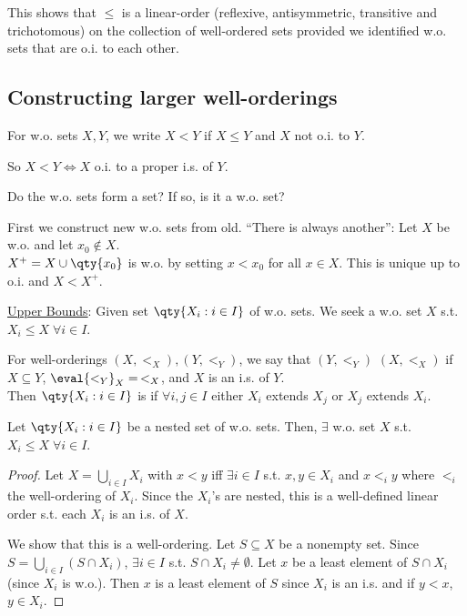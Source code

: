 \begin{remark}
    This shows that $\leq$ is a linear-order (reflexive, antisymmetric, transitive and trichotomous) on the collection of well-ordered sets provided we identified w.o. sets that are o.i. to each other.
\end{remark}

\subsection{Constructing larger well-orderings}

\begin{definition}
    For w.o. sets $X, Y$, we write $X < Y$ if $X \leq Y$ and $X$ not o.i. to $Y$.
\end{definition}
So $X < Y \iff X$ o.i. to a proper i.s. of $Y$.

\begin{question}
    Do the w.o. sets form a set? If so, is it a w.o. set?
\end{question}

\begin{answer}
    First we construct new w.o. sets from old.
    ``There is always another'': Let $X$ be w.o. and let $x_0 \not\in X$. \\
    $X^+ = X \cup \qty{x_0}$ is w.o. by setting $x < x_0$ for all $x \in X$.
    This is unique up to o.i. and $X < X^+$.
\end{answer}

\underline{Upper Bounds}: Given set $\qty{X_i : i \in I}$ of w.o. sets.
We seek a w.o. set $X$ s.t. $X_i \leq X \; \forall i \in I$.

\begin{definition}[Extends]
    For well-orderings $(X, <_X), (Y, <_Y)$, we say that $(Y, <_Y)$  $(X, <_X)$ if $X \subseteq Y$, $\eval{<_Y}_{X} =\, <_X$, and $X$ is an i.s. of $Y$. \\
    Then $\qty{X_i : i \in I}$ is  if $\forall i, j \in I$ either $X_i$ extends $X_j$ or $X_j$ extends $X_i$.
\end{definition}

\begin{proposition} \label{prp:8}
    Let $\qty{X_i : i \in I}$ be a nested set of w.o. sets.
    Then, $\exists$ w.o. set $X$ s.t. $X_i \leq X \; \forall i \in I$.
\end{proposition}

\begin{proof}
    Let $X = \bigcup_{i \in I} X_i$ with $x < y$ iff $\exists i \in I$ s.t. $x, y \in X_i$ and $x <_i y$ where $<_i$ the well-ordering of $X_i$.
    Since the $X_i$'s are nested, this is a well-defined linear order s.t. each $X_i$ is an i.s. of $X$.

    We show that this is a well-ordering.
    Let $S \subseteq X$ be a nonempty set.
    Since $S = \bigcup_{i \in I} (S \cap X_i)$, $\exists i \in I$ s.t. $S \cap X_i \neq \emptyset$.
    Let $x$ be a least element of $S \cap X_i$ (since $X_i$ is w.o.).
    Then $x$ is a least element of $S$ since $X_i$ is an i.s. and if $y < x$, $y \in X_i$.
\end{proof}

